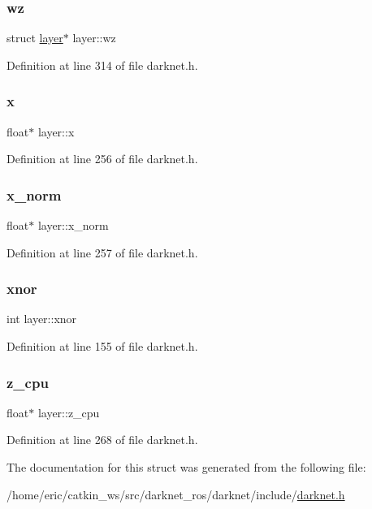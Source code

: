 \subsubsection{\texorpdfstring{wz}{wz}}
{\footnotesize\ttfamily struct \mbox{\hyperlink{structlayer}{layer}}$\ast$ layer\+::wz}



Definition at line 314 of file darknet.\+h.

\mbox{\label{structlayer_a78b279684acc59b1b891f63225e5715e}} 
\subsubsection{\texorpdfstring{x}{x}}
{\footnotesize\ttfamily float$\ast$ layer\+::x}



Definition at line 256 of file darknet.\+h.

\mbox{\label{structlayer_a080a015b7c11489ecca087ece911a6b6}} 
\subsubsection{\texorpdfstring{x\_norm}{x\_norm}}
{\footnotesize\ttfamily float$\ast$ layer\+::x\+\_\+norm}



Definition at line 257 of file darknet.\+h.

\mbox{\label{structlayer_abd05a6404f54ecf89e6ddc0c23d431ab}} 
\subsubsection{\texorpdfstring{xnor}{xnor}}
{\footnotesize\ttfamily int layer\+::xnor}



Definition at line 155 of file darknet.\+h.

\mbox{\label{structlayer_aa38a67974b34aad9ada08b970ace3318}} 
\subsubsection{\texorpdfstring{z\_cpu}{z\_cpu}}
{\footnotesize\ttfamily float$\ast$ layer\+::z\+\_\+cpu}



Definition at line 268 of file darknet.\+h.



The documentation for this struct was generated from the following file\+:\begin{DoxyCompactItemize}
\item 
/home/eric/catkin\+\_\+ws/src/darknet\+\_\+ros/darknet/include/\mbox{\hyperlink{darknet_8h}{darknet.\+h}}\end{DoxyCompactItemize}
